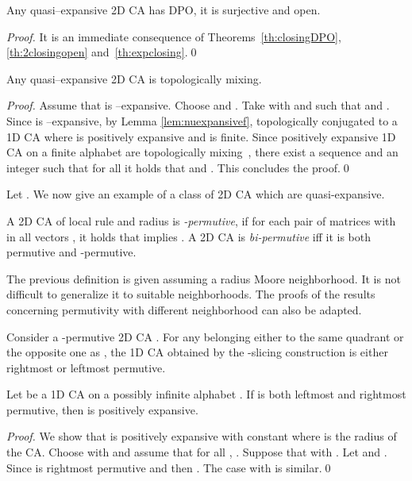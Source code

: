 \documentclass{llncs}
\begin{document}
\begin{corollary}\label{cor:quasiexp-dpo-surj-op}
Any quasi--expansive 2D CA has DPO, it is surjective and open.
\end{corollary}
\begin{proof}
It is an immediate consequence of Theorems~\ref{th:closingDPO},
\ref{th:2closingopen} and~\ref{th:expclosing}.\qed
\end{proof}
\begin{theorem}
\label{th:expmixing} Any quasi--expansive 2D CA  is
topologically mixing.
\end{theorem}
\begin{proof}
Assume that  is --expansive. Choose  and
. Take  with  and  such that  and
. Since  is
--expansive, by Lemma \ref{lem:nuexpansivef}, 
topologically conjugated to a 1D CA  where
 is positively expansive and  is finite. Since positively
expansive 1D CA on a finite alphabet are topologically
mixing~\cite{kurka97,blanchard97}, there exist a sequence
 and an integer  such that for all
 it holds that  and
. This concludes the
proof.\qed
\end{proof}
Let .
We now give an example of a class of 2D CA which are quasi-expansive. 
\begin{definition}[Permutivity]
A 2D CA of local rule  and radius  is
\emph{-permutive}, if for each pair of matrices
 with  in all vectors , it holds that  implies
. A 2D CA is \emph{bi-permutive} iff it is both
 permutive and -permutive.
\end{definition}
The previous definition is given assuming a  radius Moore
neighborhood. It is not difficult to generalize it to suitable
neighborhoods. The proofs of the results concerning permutivity
with different neighborhood can also be adapted.
\begin{proposition}\label{lem:permperm}
Consider a -permutive 2D CA . For any  belonging either to the same quadrant or the opposite one as , the 1D CA 
 obtained by
the -slicing construction is either rightmost or leftmost permutive.
\end{proposition}
\begin{lemma}
\label{lemma:bipinf} Let  be a 1D CA on a possibly
infinite alphabet . If  is both leftmost and rightmost
permutive, then  is positively expansive.
\end{lemma}
\begin{proof}
We show that  is positively expansive with constant
 where  is the radius of the CA. Choose
 with  and assume that for all ,
. Suppose that  with
. Let  and . Since
 is rightmost permutive and  then
. The case  with  is similar.\qed
\end{proof}
\end{document}
